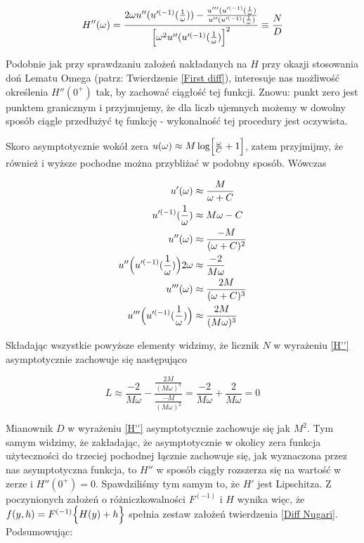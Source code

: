 \begin{equation}\label{H''}
	H''(\omega) = \frac{2\omega u''(u'^{(-1)}(\frac{1}{\omega})) - \frac{u'''(u'^{(-1)}(\frac{1}{\omega})}{u''(u'^{(-1)}(\frac{1}{\omega})}}{\Bigl[ \omega^2 u''(u'^{(-1)}(\frac{1}{\omega}) \Bigl]^2} \equiv \frac{N}{D}
\end{equation}

Podobnie jak przy sprawdzaniu założeń nakładanych na $ H $ przy okazji stosowania doń Lematu Omega (patrz: Twierdzenie \ref{First diff}), interesuje nas możliwość określenia $ H''(0^{+}) $ tak, by zachować ciągłość tej funkcji. Znowu: punkt zero jest punktem granicznym i przyjmujemy, że dla liczb ujemnych możemy w dowolny sposób ciągle przedłużyć tę funkcję - wykonalność tej procedury jest oczywista. 

Skoro asymptotycznie wokół zera $ u(\omega) \approx M \log \Bigl[ \frac{\omega}{C} + 1 \Bigl] $, zatem przyjmijmy, że również i wyższe pochodne można przybliżać w podobny sposób. Wówczas

\begin{align*}
\begin{split}
	u'(\omega) 					&\approx \frac{M}{\omega + C} 		\\
	u'^{(-1)}(\frac{1}{\omega}) &\approx M\omega - C 				\\
	u''(\omega ) 				&\approx \frac{-M}{(\omega + C)^2} 	\\
	u''\Bigl( u'^{(-1)}(\frac{1}{\omega})\Bigl) 2\omega &\approx  \frac{-2}{M \omega} 	\\
	u'''(\omega) 				&\approx \frac{2 M}{(\omega + C)^3}	\\
	u'''\Bigl( u'^{(-1)}(\frac{1}{\omega})\Bigl) &\approx \frac{2M}{(M\omega)^3}		\\
\end{split}
\end{align*}

Składając wszystkie powyższe elementy widzimy, że licznik $ N $ w wyrażeniu \ref{H''} asymptotycznie zachowuje się następująco

$$ L \approx \frac{-2}{M\omega} - \frac{\frac{2M}{(M\omega)^3}}{\frac{-M}{(M\omega)^2}} = \frac{-2}{M\omega} + \frac{2}{M\omega} = 0 $$ 

Mianownik $ D $ w wyrażeniu \ref{H''} asymptotycznie zachowuje się jak $ M^2 $. Tym samym widzimy, że zakładając, że asymptotycznie w okolicy zera funkcja użyteczności do trzeciej pochodnej łącznie zachowuje się, jak wyznaczona przez nas asymptotyczna funkcja, to $ H'' $ w sposób ciągły rozszerza się na wartość w zerze i $ H''(0^{+}) = 0 $.
Spawdziliśmy tym samym to, że $ H' $ jest Lipschitza. Z poczynionych założeń o różniczkowalności $ F^{(-1)} $ i $ H $ wynika więc, że $ f(y,h) = F^{(-1)} \Bigl \{ H(y) + h \Bigl \}$ spełnia zestaw założeń twierdzenia \ref{Diff Nugari}. Podsumowując:


